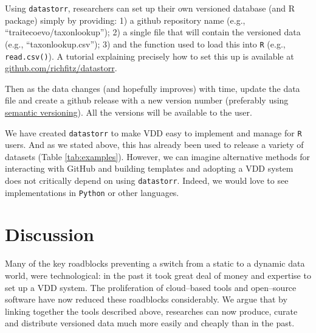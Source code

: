 \documentclass[a4paper,11pt]{article}
\newcommand{\smurl}[1]{{\footnotesize\url{#1}}}
\begin{document}
Using \texttt{datastorr}, researchers can set up their own versioned database (and R package) simply by providing: 1) a github repository name (e.g., ``traitecoevo/taxonlookup''); 2) a single file that will contain the versioned data (e.g., ``taxonlookup.csv''); 3) and the function used to load this into \texttt{R} (e.g., \texttt{read.csv()}). A tutorial explaining precisely how to set this up is available at \smurl{github.com/richfitz/datastorr}. %

Then as the data changes (and hopefully improves) with time, update the data
file and create a github release with a new version number (preferably
using \href{http://semver.org/}{semantic versioning}). All the versions
will be available to the user. 

We have created \texttt{datastorr} to make VDD easy to implement and manage for \texttt{R} users. And as we stated above, this has already been used to release a variety of datasets (Table \ref{tab:examples}). However, we can imagine alternative methods for interacting with GitHub and building templates and adopting a VDD system does not critically depend on using \texttt{datastorr}. Indeed, we would love to see implementations in \texttt{Python} or other languages.

\section{Discussion}

Many of the key roadblocks preventing a switch from a static to a dynamic data world, were technological: in the past it took great deal of money and expertise to set up a VDD system. The proliferation of cloud--based tools and open--source software have now reduced these roadblocks considerably.  We argue that by linking together the tools described above, researches can now produce, curate and distribute versioned data much more easily and cheaply than in the past.  



%
%
\end{document}
